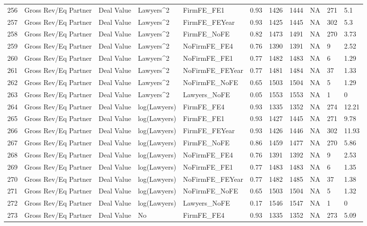 \documentclass{article}
\begin{document}
\begin{table}[H]
\begin{tabular}{rllllllllll}
  256 & Gross Rev/Eq Partner & Deal Value & Lawyers^2 & FirmFE\_FE1 & 0.93 & 1426 & 1444 & NA & 271 & 5.1 \\
  257 & Gross Rev/Eq Partner & Deal Value & Lawyers^2 & FirmFE\_FEYear & 0.93 & 1425 & 1445 & NA & 302 & 5.3 \\
  258 & Gross Rev/Eq Partner & Deal Value & Lawyers^2 & FirmFE\_NoFE & 0.82 & 1473 & 1491 & NA & 270 & 3.73 \\
  259 & Gross Rev/Eq Partner & Deal Value & Lawyers^2 & NoFirmFE\_FE4 & 0.76 & 1390 & 1391 & NA & 9 & 2.52 \\
  260 & Gross Rev/Eq Partner & Deal Value & Lawyers^2 & NoFirmFE\_FE1 & 0.77 & 1482 & 1483 & NA & 6 & 1.29 \\
  261 & Gross Rev/Eq Partner & Deal Value & Lawyers^2 & NoFirmFE\_FEYear & 0.77 & 1481 & 1484 & NA & 37 & 1.33 \\
  262 & Gross Rev/Eq Partner & Deal Value & Lawyers^2 & NoFirmFE\_NoFE & 0.65 & 1503 & 1504 & NA & 5 & 1.29 \\
  263 & Gross Rev/Eq Partner & Deal Value & Lawyers^2 & Lawyers\_NoFE & 0.05 & 1553 & 1553 & NA & 1 & 0 \\
  264 & Gross Rev/Eq Partner & Deal Value & log(Lawyers) & FirmFE\_FE4 & 0.93 & 1335 & 1352 & NA & 274 & 12.21 \\
  265 & Gross Rev/Eq Partner & Deal Value & log(Lawyers) & FirmFE\_FE1 & 0.93 & 1427 & 1445 & NA & 271 & 9.78 \\
  266 & Gross Rev/Eq Partner & Deal Value & log(Lawyers) & FirmFE\_FEYear & 0.93 & 1426 & 1446 & NA & 302 & 11.93 \\
  267 & Gross Rev/Eq Partner & Deal Value & log(Lawyers) & FirmFE\_NoFE & 0.86 & 1459 & 1477 & NA & 270 & 5.86 \\
  268 & Gross Rev/Eq Partner & Deal Value & log(Lawyers) & NoFirmFE\_FE4 & 0.76 & 1391 & 1392 & NA & 9 & 2.53 \\
  269 & Gross Rev/Eq Partner & Deal Value & log(Lawyers) & NoFirmFE\_FE1 & 0.77 & 1483 & 1483 & NA & 6 & 1.35 \\
  270 & Gross Rev/Eq Partner & Deal Value & log(Lawyers) & NoFirmFE\_FEYear & 0.77 & 1482 & 1485 & NA & 37 & 1.38 \\
  271 & Gross Rev/Eq Partner & Deal Value & log(Lawyers) & NoFirmFE\_NoFE & 0.65 & 1503 & 1504 & NA & 5 & 1.32 \\
  272 & Gross Rev/Eq Partner & Deal Value & log(Lawyers) & Lawyers\_NoFE & 0.17 & 1546 & 1547 & NA & 1 & 0 \\
  273 & Gross Rev/Eq Partner & Deal Value & No & FirmFE\_FE4 & 0.93 & 1335 & 1352 & NA & 273 & 5.09 \\

\end{tabular}
\end{table}
\end{document}
